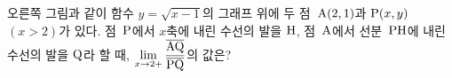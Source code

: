 \noindent\begin{minipage}[t]{0.58\linewidth}\vspace{0pt}\raggedright 오른쪽 그림과 같이 함수 $y=\sqrt{x-1}$의 그래프 위에 두 점~$\mathrm{A}(2{,}\mkern3mu\mathopen{}1)$과 $\mathrm{P}(x{,}\mkern3mu\mathopen{}y)$ $(x>2)$가 있다. 점~$\mathrm{P}$에서 $x$축에 내린 수선의 발을 $\mathrm{H}$, 점~$\mathrm{A}$에서 선분~$\mathrm{PH}$에 내린 수선의 발을 $\mathrm{Q}$라 할 때, $\displaystyle\lim_{x\to 2+}\dfrac{\overline{\mathrm{AQ}}}{\overline{\mathrm{PQ}}}$의 값은?\end{minipage}\hfill\begin{minipage}[t]{0.4\linewidth}\vspace{0pt}\centering \resizebox{\ifdim\width>\linewidth\linewidth\else\width\fi}{!}{}\end{minipage}\par
{}
